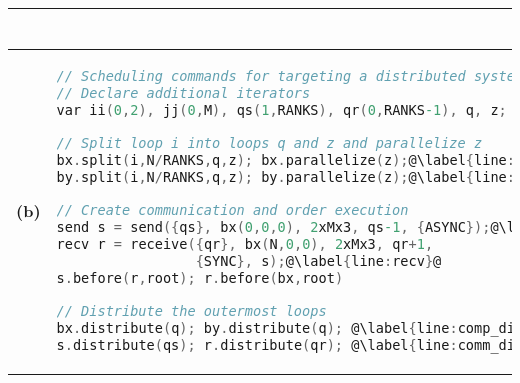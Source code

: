 \begin{figure*}[t]
\begin{tabular}{cl|@{}l}
\begin{lstlisting}[language=C,escapechar=@]
\end{lstlisting}
    

\\\hline
{\textbf{\normalsize(b)}} &
\begin{lstlisting}[language=C,escapechar=@]
// Scheduling commands for targeting a distributed system
// Declare additional iterators
var ii(0,2), jj(0,M), qs(1,RANKS), qr(0,RANKS-1), q, z;

// Split loop i into loops q and z and parallelize z
bx.split(i,N/RANKS,q,z); bx.parallelize(z);@\label{line:split1}@
by.split(i,N/RANKS,q,z); by.parallelize(z);@\label{line:split2}@ 

// Create communication and order execution
send s = send({qs}, bx(0,0,0), 2xMx3, qs-1, {ASYNC});@\label{line:send}@
recv r = receive({qr}, bx(N,0,0), 2xMx3, qr+1, 
                 {SYNC}, s);@\label{line:recv}@
s.before(r,root); r.before(bx,root)

// Distribute the outermost loops
bx.distribute(q); by.distribute(q); @\label{line:comp_dist}@
s.distribute(qs); r.distribute(qr); @\label{line:comm_dist}@
\end{lstlisting}

& 


\begin{lstlisting}[language=C,escapechar=@]

 @{\color{listingkeywordcolor}{\textbf{distributed}}}@ for (qs in 1..RANKS) @\label{line:distfor}@
   send(bx(0,0,0), 2xMx3, qs-1,{ASYNC,BLK})
 @{\color{listingkeywordcolor}{\textbf{distributed}}}@ for (qr in 0..RANKS-1)
   recv(bx(N,0,0), 2xMx3, qr+1, {SYNC,BLK})

 @{\color{listingkeywordcolor}{\textbf{distributed}}}@ for (q in 0..RANKS)
   @{\color{listingkeywordcolor}{\textbf{parallel}}}@ for (i in 0..N/RANKS)
    for (j in 0..M)
      for (c in 0..3)
        bx[i][j][c] = (in[i][j][c]+in[i][j+1][c]+in[i][j+2][c])/3@\label{fig:motivating:code2:stmt1}@
 @{\color{listingkeywordcolor}{\textbf{distributed}}}@ for (q in 0..RANKS)
   @{\color{listingkeywordcolor}{\textbf{parallel}}}@ for (i in 0..N/RANKS)
    for (j in 0..M)
      for (c in 0..3)
        by[i][j][c] = (bx[i][j][c]+bx[i+1][j][c]+bx[i+2][j][c])/3
\end{lstlisting}


\\\hline
\end{tabular}
\vspace{-0.25cm}
\caption{Two examples illustrating \framework{} scheduling commands (left) and the corresponding generated code (right). (a) shows scheduling commands for mapping to GPU; (b) uses commands to map to a distributed CPU machine.}
\label{fig:mainexample}
\vspace{-0.25cm}
\end{figure*}


